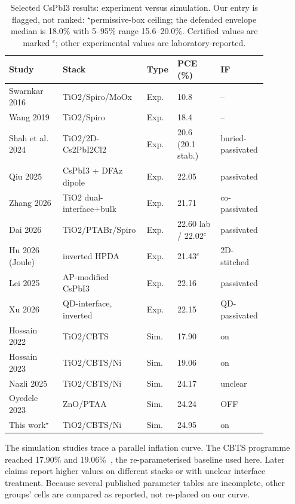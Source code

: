 \documentclass[11pt,a4paper]{article}
\begin{document}
\begin{table}[htbp]
\centering
\caption{Selected CsPbI3 results: experiment versus simulation. Our entry is flagged, not ranked: $^{\star}$permissive-box ceiling; the defended envelope median is 18.0\% with 5--95\% range 15.6--20.0\%. Certified values are marked $^{c}$; other experimental values are laboratory-reported.}
\label{tab:lit}
\small
\begingroup
\setlength{\tabcolsep}{3pt}
\begin{tabular}{|p{0.20\linewidth}|p{0.27\linewidth}|p{0.08\linewidth}|p{0.16\linewidth}|p{0.15\linewidth}|}
\hline\hline
Study & Stack & Type & PCE (\%) & IF \\
\hline
Swarnkar 2016 & TiO2/Spiro/MoOx & Exp. & 10.8~\cite{Swarnkar2016} & \mbox{--} \\
Wang 2019 & TiO2/Spiro & Exp. & 18.4~\cite{Wang2019} & \mbox{--} \\
Shah et al. 2024 & TiO2/2D-Cs2PbI2Cl2 & Exp. & 20.6 (20.1 stab.)~\cite{Shah2024} & \mbox{buried-passivated} \\
Qiu 2025 & CsPbI3 + DFAz dipole & Exp. & 22.05~\cite{Qiu2025} & \mbox{passivated} \\
Zhang 2026 & TiO2 dual-interface+bulk & Exp. & 21.71~\cite{Zhang2026} & \mbox{co-passivated} \\
Dai 2026 & TiO2/PTABr/Spiro & Exp. & 22.60 lab / 22.02$^{c}$~\cite{Dai2026} & \mbox{passivated} \\
Hu 2026 (Joule) & inverted HPDA & Exp. & 21.43$^{c}$~\cite{Joule2026} & \mbox{2D-stitched} \\
Lei 2025 & AP-modified CsPbI3 & Exp. & 22.16~\cite{Lei2025} & \mbox{passivated} \\
Xu 2026 & QD-interface, inverted & Exp. & 22.15~\cite{XuQD2026} & \mbox{QD-passivated} \\
Hossain 2022 & TiO2/CBTS & Sim. & 17.90~\cite{Hossain2022} & \mbox{on} \\
Hossain 2023 & TiO2/CBTS/Ni & Sim. & 19.06~\cite{Hossain2023} & \mbox{on} \\
Nazli 2025 & TiO2/CBTS/Ni & Sim. & 24.17~\cite{Nazli2025} & \mbox{unclear} \\
Oyedele 2023 & ZnO/PTAA & Sim. & 24.24~\cite{Oyedele2023} & \mbox{OFF} \\
This work$^{\star}$ & TiO2/CBTS/Ni & Sim. & 24.95 & \mbox{on} \\
\hline\hline
\end{tabular}
\endgroup
\end{table}

The simulation studies trace a parallel inflation curve. The CBTS programme reached 17.90\% and 19.06\%~\cite{Hossain2022,Hossain2023}, the re-parameterised baseline used here. Later claims report higher values on different stacks or with unclear interface treatment. Because several published parameter tables are incomplete, other groups' cells are compared as reported, not re-placed on our curve.
\end{document}
